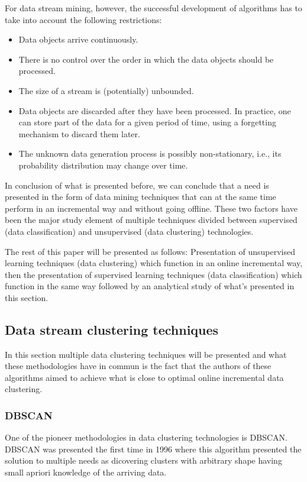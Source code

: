 \documentclass[]{article}
\begin{document}
For data stream mining, however, the successful development of algorithms
has to take into account the following restrictions:

\begin{itemize}
	\item Data objects arrive continuously.
	\item There is no control over the order in which the data objects should be processed.
	\item The size of a stream is (potentially) unbounded.
	\item Data objects are discarded after they have been processed. In practice, one can store part of the data for a given period of time, using a forgetting mechanism to discard them later.
	\item The unknown data generation process is possibly non-stationary, i.e., its probability distribution may change over time.
\end{itemize}

In conclusion of what is presented before, we can conclude that a need is presented in the form of data mining techniques that can at the same time perform in an incremental way and without going offline. These two factors have been the major study element of multiple techniques divided between supervised (data classification) and unsupervised (data clustering) technologies.

The rest of this paper will be presented as follows: Presentation of unsupervised learning techniques (data clustering) which function in an online incremental way, then the presentation of supervised learning techniques (data classification) which function in the same way followed by an analytical study of what's presented in this section.

\subsection{Data stream clustering techniques}

In this section multiple data clustering techniques will be presented and what these methodologies have in commun is the fact that the authors of these algorithms aimed to achieve what is close to optimal online incremental data clustering.

\subsubsection{DBSCAN}

One of the pioneer methodologies in data clustering technologies is DBSCAN. DBSCAN was presented the first time in 1996 \cite{ester1996density} where this algorithm presented the solution to multiple needs as dicovering clusters with arbitrary shape having small apriori knowledge of the arriving data.
\end{document}
